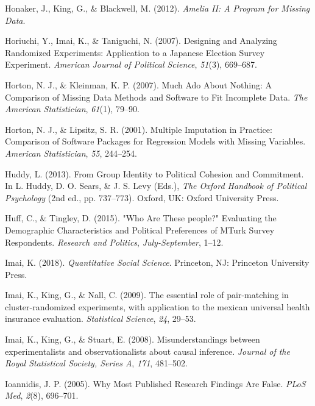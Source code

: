 \documentclass[12pt,econ]{sources/authesis}
\begin{document}
\leavevmode\hypertarget{ref-honaker_2012_amelia}{}%
Honaker, J., King, G., \& Blackwell, M. (2012). \emph{Amelia II: A Program for Missing Data}.

\leavevmode\hypertarget{ref-horiuchi_2007_designing}{}%
Horiuchi, Y., Imai, K., \& Taniguchi, N. (2007). Designing and Analyzing Randomized Experiments: Application to a Japanese Election Survey Experiment. \emph{American Journal of Political Science}, \emph{51}(3), 669--687.

\leavevmode\hypertarget{ref-horton_2007_much}{}%
Horton, N. J., \& Kleinman, K. P. (2007). Much Ado About Nothing: A Comparison of Missing Data Methods and Software to Fit Incomplete Data. \emph{The American Statistician}, \emph{61}(1), 79--90.

\leavevmode\hypertarget{ref-horton_2001_multiple}{}%
Horton, N. J., \& Lipsitz, S. R. (2001). Multiple Imputation in Practice: Comparison of Software Packages for Regression Models with Missing Variables. \emph{American Statistician}, \emph{55}, 244--254.

\leavevmode\hypertarget{ref-huddy_2013_from}{}%
Huddy, L. (2013). From Group Identity to Political Cohesion and Commitment. In L. Huddy, D. O. Sears, \& J. S. Levy (Eds.), \emph{The Oxford Handbook of Political Psychology} (2nd ed., pp. 737--773). Oxford, UK: Oxford University Press.

\leavevmode\hypertarget{ref-huff_who_2015}{}%
Huff, C., \& Tingley, D. (2015). "Who Are These people?" Evaluating the Demographic Characteristics and Political Preferences of MTurk Survey Respondents. \emph{Research and Politics}, \emph{July-September}, 1--12.

\leavevmode\hypertarget{ref-imai_quantitative_2018}{}%
Imai, K. (2018). \emph{Quantitative Social Science}. Princeton, NJ: Princeton University Press.

\leavevmode\hypertarget{ref-imai_2009_essential}{}%
Imai, K., King, G., \& Nall, C. (2009). The essential role of pair-matching in cluster-randomized experiments, with application to the mexican universal health insurance evaluation. \emph{Statistical Science}, \emph{24}, 29--53.

\leavevmode\hypertarget{ref-imai_2008_misunderstandings}{}%
Imai, K., King, G., \& Stuart, E. (2008). Misunderstandings between experimentalists and observationalists about causal inference. \emph{Journal of the Royal Statistical Society, Series A}, \emph{171}, 481--502.

\leavevmode\hypertarget{ref-ioannidis_2005_most}{}%
Ioannidis, J. P. (2005). Why Most Published Research Findings Are False. \emph{PLoS Med}, \emph{2}(8), 696--701.
\end{document}
